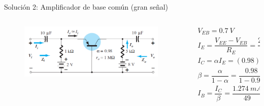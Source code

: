 \documentclass[t,aspectratio=169]{beamer}
\begin{document}
\begin{frame}{Solución 2: Amplificador de base común (gran señal)}

\begin{columns}
\begin{column}{0.5\textwidth}

\begin{figure}[H]
    \centering
    \includegraphics[width=\textwidth]{figuras/modelo_re_base_comun_3.png}
\end{figure}

\end{column}
\begin{column}{0.5\textwidth}

\begin{align*}
&V_{EB} = 0.7\ V \\
&I_E = \dfrac{V_{EE} - V_{EB}}{R_E} = \dfrac{2\ V - 0.7\ V}{1\ k\Omega} = 1.3\ mA \\
&I_C = \alpha I_E = (0.98)(1.3\ mA) = 1.274\ mA \\
&\beta = \dfrac{\alpha}{1 - \alpha} = \dfrac{0.98}{1 - 0.98} = 49 \\
&I_B = \dfrac{I_C}{\beta} = \dfrac{1.274\ mA}{49} = 26\ \mu A \\
\end{align*}

\end{column}
\end{columns}

\end{frame}
\end{document}
